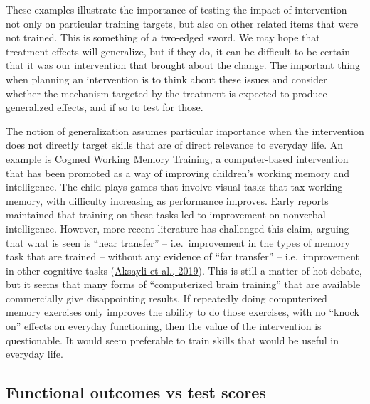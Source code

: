 \documentclass{krantz}
\begin{document}
These examples illustrate the importance of testing the impact of intervention not only on particular training targets, but also on other related items that were not trained. This is something of a two-edged sword. We may hope that treatment effects will generalize, but if they do, it can be difficult to be certain that it was our intervention that brought about the change. The important thing when planning an intervention is to think about these issues and consider whether the mechanism targeted by the treatment is expected to produce generalized effects, and if so to test for those.

The notion of generalization assumes particular importance when the intervention does not directly target skills that are of direct relevance to everyday life. An example is \href{https://www.cogmed.com/}{Cogmed Working Memory Training}, a computer-based intervention that has been promoted as a way of improving children's working memory and intelligence. The child plays games that involve visual tasks that tax working memory, with difficulty increasing as performance improves. Early reports maintained that training on these tasks led to improvement on nonverbal intelligence. However, more recent literature has challenged this claim, arguing that what is seen is ``near transfer'' -- i.e.~improvement in the types of memory task that are trained -- without any evidence of ``far transfer'' -- i.e.~improvement in other cognitive tasks (\protect\hyperlink{ref-aksayli2019}{Aksayli et al., 2019}). This is still a matter of hot debate, but it seems that many forms of ``computerized brain training'' that are available commercially give disappointing results. If repeatedly doing computerized memory exercises only improves the ability to do those exercises, with no ``knock on'' effects on everyday functioning, then the value of the intervention is questionable. It would seem preferable to train skills that would be useful in everyday life.

\hypertarget{functional-outcomes-vs-test-scores}{%
\subsection{Functional outcomes vs test scores}\label{functional-outcomes-vs-test-scores}}
\end{document}
